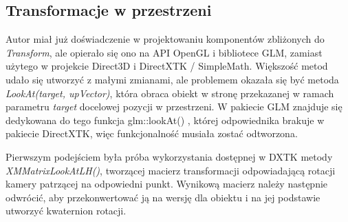 \subsection{Transformacje w przestrzeni}
Autor miał już doświadczenie w projektowaniu komponentów zbliżonych do \textit{Transform}, ale opierało się ono na API OpenGL i bibliotece GLM, zamiast użytego w projekcie Direct3D i DirectXTK / SimpleMath. Większość metod udało się utworzyć z małymi zmianami, ale problemem okazała się być metoda \textit{LookAt(target, upVector)}, która obraca obiekt w stronę przekazanej w ramach parametru \textit{target} docelowej pozycji w przestrzeni.  W pakiecie GLM znajduje się dedykowana do tego funkcja glm::lookAt() \cite{glm:docs:look_at}, której odpowiednika brakuje w pakiecie DirectXTK, więc funkcjonalność musiała zostać odtworzona. 

Pierwszym podejściem była próba wykorzystania dostępnej w DXTK metody \textit{XMMatrixLookAtLH()}, tworzącej macierz transformacji odpowiadającą rotacji kamery patrzącej na odpowiedni punkt. Wynikową macierz należy następnie odwrócić, aby przekonwertować ją na wersję dla obiektu i na jej podstawie utworzyć kwaternion rotacji. 